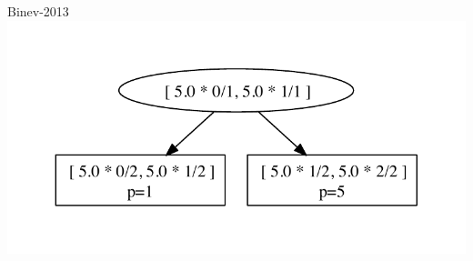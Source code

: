 \documentclass{beamer}
\begin{document}
\begin{frame}{Binev-2013}
{  \includegraphics[height=0.5\textheight]{tree_hp_5.pdf}}

\end{frame}
\end{document}

